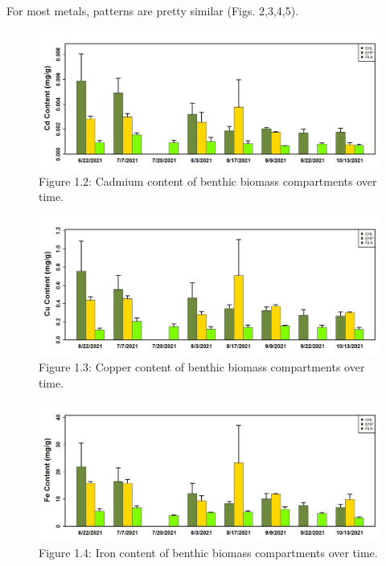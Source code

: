 \documentclass[
]{article}
\begin{document}
\FloatBarrier

For most metals, patterns are pretty similar (Figs. 2,3,4,5).

\begin{figure}
\includegraphics[width=1\linewidth]{Figures/2} \caption[Figure 1.2]{Figure 1.2: Cadmium content of benthic biomass compartments over time.}\label{fig:unnamed-chunk-2}
\end{figure}

\FloatBarrier

\begin{figure}
\includegraphics[width=1\linewidth]{Figures/3} \caption[Figure 1.3]{Figure 1.3: Copper content of benthic biomass compartments over time.}\label{fig:unnamed-chunk-3}
\end{figure}

\FloatBarrier

\begin{figure}
\includegraphics[width=1\linewidth]{Figures/4} \caption[Figure 1.4]{Figure 1.4: Iron content of benthic biomass compartments over time.}\label{fig:unnamed-chunk-4}
\end{figure}
\end{document}
